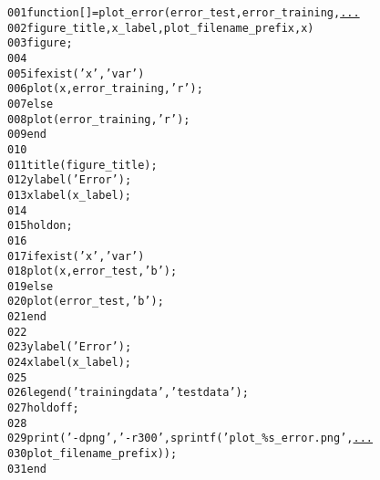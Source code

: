 \begin{alltt}
\textcolor{linenr}{001  }\textcolor{keyword}{function} [] = plot\_error(error\_test, error\_training, \textcolor{keyword}{\underline{...}}
\textcolor{linenr}{002  }    figure\_title, x\_label, plot\_filename\_prefix, x)
\textcolor{linenr}{003  }    figure;
\textcolor{linenr}{004  }     
\textcolor{linenr}{005  }    \textcolor{keyword}{if} exist(\textcolor{string}{'x'}, \textcolor{string}{'var'})
\textcolor{linenr}{006  }        plot(x, error\_training, \textcolor{string}{'r'});
\textcolor{linenr}{007  }    \textcolor{keyword}{else}
\textcolor{linenr}{008  }        plot(error\_training, \textcolor{string}{'r'});
\textcolor{linenr}{009  }    \textcolor{keyword}{end}
\textcolor{linenr}{010  }
\textcolor{linenr}{011  }    title(figure\_title);
\textcolor{linenr}{012  }    ylabel(\textcolor{string}{'Error'});
\textcolor{linenr}{013  }    xlabel(x\_label);
\textcolor{linenr}{014  }  
\textcolor{linenr}{015  }    hold on; 
\textcolor{linenr}{016  }    
\textcolor{linenr}{017  }     \textcolor{keyword}{if} exist(\textcolor{string}{'x'}, \textcolor{string}{'var'})
\textcolor{linenr}{018  }        plot(x, error\_test, \textcolor{string}{'b'});
\textcolor{linenr}{019  }    \textcolor{keyword}{else}
\textcolor{linenr}{020  }        plot(error\_test, \textcolor{string}{'b'});
\textcolor{linenr}{021  }    \textcolor{keyword}{end}
\textcolor{linenr}{022  }    
\textcolor{linenr}{023  }    ylabel(\textcolor{string}{'Error'});
\textcolor{linenr}{024  }    xlabel(x\_label);
\textcolor{linenr}{025  }  
\textcolor{linenr}{026  }    legend(\textcolor{string}{'training data'}, \textcolor{string}{'test data'});
\textcolor{linenr}{027  }    hold off;
\textcolor{linenr}{028  }  
\textcolor{linenr}{029  }    print(\textcolor{string}{'-dpng'}, \textcolor{string}{'-r300'}, sprintf(\textcolor{string}{'plot\_\%s\_error.png'}, \textcolor{keyword}{\underline{...}}
\textcolor{linenr}{030  }        plot\_filename\_prefix));
\textcolor{linenr}{031  }\textcolor{keyword}{end}
\end{alltt}
